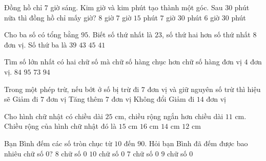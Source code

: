 \begin{ex} %
Đồng hồ chỉ $7$ giờ sáng. Kim giờ và kim phút tạo thành một góc. Sau $30$ phút nữa thì đồng hồ chỉ mấy giờ?
\choice
{$8$ giờ}
{$7$ giờ $15$ phút}
{\True $7$ giờ $30$ phút}
{$6$ giờ $30$ phút}
\end{ex}

\begin{ex} %
Cho ba số có tổng bằng $95$. Biết số thứ nhất là $23$, số thứ hai hơn số thứ nhất $8$ đơn vị. Số thứ ba là
\choice
{$39$}
{$43$}
{$45$}
{\True $41$}
\end{ex}

\begin{ex} %
Tìm số lớn nhất có hai chữ số mà chữ số hàng chục hơn chữ số hàng đơn vị $4$ đơn vị.
\choice
{$84$}
{\True $95$}
{$73$}
{$94$}
\end{ex}

\begin{ex} %
Trong một phép trừ, nếu bớt ở số bị trừ đi $7$ đơn vị và giữ nguyên số trừ thì hiệu sẽ
\choice
{\True Giảm đi $7$ đơn vị}
{Tăng thêm $7$ đơn vị}
{Không đổi}
{Giảm đi $14$ đơn vị}
\end{ex}

\begin{ex} %
Cho hình chữ nhật có chiều dài $25\text{ cm}$, chiều rộng ngắn hơn chiều dài $11\text{ cm}$. Chiều rộng của hình chữ nhật đó là
\choice
{$15\text{ cm}$}
{$16\text{ cm}$}
{\True $14\text{ cm}$}
{$12\text{ cm}$}
\end{ex}

\begin{ex} %
Bạn Bình đếm các số tròn chục từ $10$ đến $90$. Hỏi bạn Bình đã đếm được bao nhiêu chữ số $0$?
\choice
{$8$ chữ số $0$}
{$10$ chữ số $0$}
{$7$ chữ số $0$}
{\True $9$ chữ số $0$}
\end{ex}

